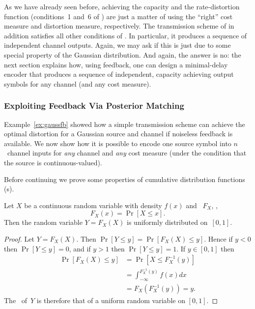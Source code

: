 As we have already seen before, achieving the capacity and the
rate-dis\-tor\-tion function (conditions~1 and~6 of
) are just a matter of using the ``right'' cost
measure and distortion measure, respectively. The transmission scheme of
 in addition satisfies all other conditions of
. In particular, it produces a sequence of
independent channel outputs. Again, we may ask if this is just due to some
special property of the Gaussian distribution. And again, the answer is no: the
next section explains how, using feedback, one can design a minimal-delay
encoder that produces a sequence of independent, capacity achieving output
symbols for any channel (and any cost measure).


\subsubsection{Exploiting Feedback Via Posterior Matching}

Example~\ref{ex:gaussfb} showed how a simple transmission scheme can achieve the
optimal distortion for a Gaussian source and channel if noiseless feedback is
available.  We now show how it is possible to encode one source symbol into
$n$~channel inputs for \emph{any} channel and \emph{any} cost measure (under the
condition that the source is continuous-valued).

Before continuing we prove some properties of cumulative distribution functions
(\cdf s).

\begin{lemma}
  \label{lem:cdfunif}
  Let $X$ be a continuous random variable with density $f(x)$ and \cdf\ $F_X$,
  \ie,
  \begin{equation*}
    F_X(x) = \Pr[X \le x].
  \end{equation*}
  Then the random variable $Y = F_X(X)$ is uniformly distributed on~$[0,1]$.
\end{lemma}

\begin{proof}
  Let $Y = F_X(X)$. Then $\Pr[Y \le y] = \Pr[F_X(X) \le y]$.
  Hence if $y < 0$ then $\Pr[Y \le y] = 0$, and if $y > 1$ then $\Pr[Y \le y] =
  1$.  If $y \in [0,1]$ then
  \begin{align*}
    \Pr[F_X(X) \le y] &= \Pr[X \le F_X^{-1}(y)] \\
    &= \int_{-\infty}^{F_X^{-1}(y)} f(x) dx \\
    &= F_X(F_X^{-1}(y)) = y.
  \end{align*}
  The \cdf\ of~$Y$ is therefore that of a uniform random variable on $[0,1]$.
\end{proof}


